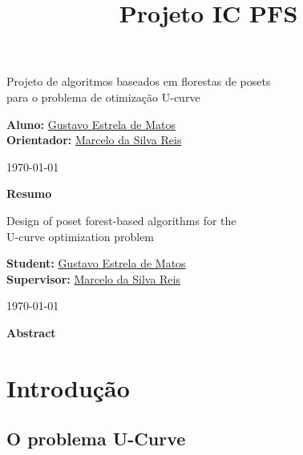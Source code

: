 \documentclass[12pt]{article}
\title{Projeto IC PFS}
\begin{document}
%
\doublespacing

\begin{center}
    {\LARGE Projeto de algoritmos baseados em florestas de posets\\
        \bigskip 
        para o problema de otimização U-curve}

    \bigskip        

    {\large {\bf Aluno:} \href{mailto:gustavo.estrela.matos@usp.br}
        {Gustavo Estrela de Matos}\\ 
    {\bf Orientador:} \href{mailto:marcelo.reis@butantan.gov.br}
        {Marcelo da Silva Reis}\\

    \bigskip

    \today\\
    }

    \bigskip
    \bigskip

    {\bf Resumo}    
\end{center}

\newpage

\begin{center}
    {\LARGE Design of poset forest-based algorithms for the\\
        \bigskip 
        U-curve optimization problem}

    \bigskip        

    {\large {\bf Student:} \href{mailto:gustavo.estrela.matos@usp.br}
        {Gustavo Estrela de Matos}\\ 
    {\bf Supervisor:} \href{mailto:marcelo.reis@butantan.gov.br}
        {Marcelo da Silva Reis}\\

    \bigskip

    \today\\
    }

    \bigskip
    \bigskip

    {\bf Abstract}    
\end{center}
    
\newpage
\tableofcontents
\newpage

\section{Introdução}

\subsection{O problema U-Curve}
\end{document}
